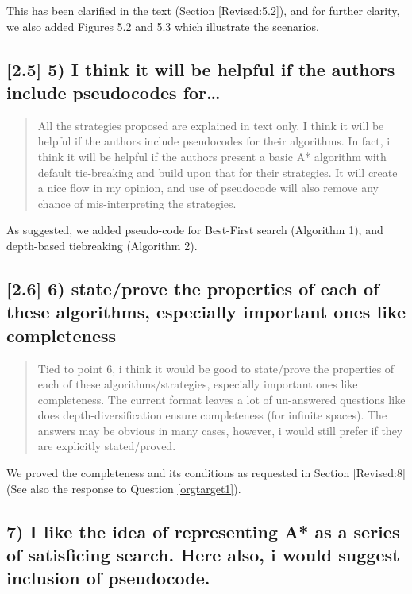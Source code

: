 \documentclass{article}
\begin{document}
This has been clarified in the text (Section [Revised:5.2]), and 
for further clarity, we also added Figures 5.2 and 5.3 which illustrate the scenarios.


\subsection{[2.5] 5) I think it will be helpful if the authors include pseudocodes for\ldots{}}
\label{sec:orgheadline19}

\begin{quote}
 All the strategies proposed are explained in text only. I think it
will be helpful if the authors include pseudocodes for their
algorithms. In fact, i think it will be helpful if the authors present
a basic A* algorithm with default tie-breaking and build upon that for
their strategies. It will create a nice flow in my opinion, and use of
pseudocode will also remove any chance of mis-interpreting the
strategies.
\end{quote}

As suggested, we added pseudo-code for  Best-First search (Algorithm 1), and depth-based tiebreaking (Algorithm 2).


\subsection{[2.6] 6) state/prove the properties of each of these algorithms, especially important ones like completeness}
\label{sec:orgheadline20}

\begin{quote}
 Tied to point 6, i think it would be good to state/prove the
properties of each of these algorithms/strategies, especially
important ones like completeness. The current format leaves a lot of
un-answered questions like does depth-diversification ensure
completeness (for infinite spaces). The answers may be obvious in many
cases, however, i would still prefer if they are explicitly
stated/proved.
\end{quote}

We proved the completeness and its conditions as requested in Section [Revised:8] (See also the response to Question \ref{orgtarget1}).

\subsection{7) I like the idea of representing A* as a series of satisficing search. Here also, i would suggest inclusion of pseudocode.}
\label{sec:orgheadline21}
\end{document}
